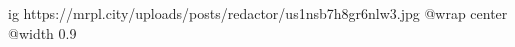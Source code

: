  
 
 
 
 

\ifcmt
  ig https://mrpl.city/uploads/posts/redactor/us1nsb7h8gr6nlw3.jpg
  @wrap center
  @width 0.9
\fi
